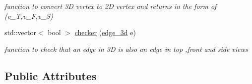 \begin{DoxyCompactItemize}
\begin{DoxyCompactList}\small\item\em function to convert 3D vertex to 2D vertex and returns in the form of (v\+\_\+T,v\+\_\+F,v\+\_\+S) \end{DoxyCompactList}\item 
std\+::vector$<$ bool $>$ \hyperlink{classobject__2d_a7c2ffd764cf62444bdffdda7abef652c}{checker} (\hyperlink{classedge__3d}{edge\+\_\+3d} e)
\begin{DoxyCompactList}\small\item\em function to check that an edge in 3D is also an edge in top ,front and side views \end{DoxyCompactList}\end{DoxyCompactItemize}
\subsection*{Public Attributes}
